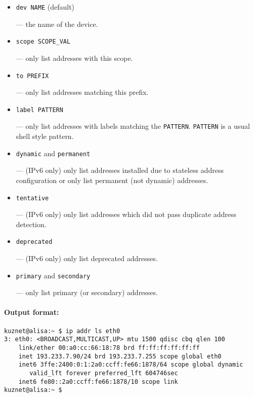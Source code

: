 \begin{itemize}
\item \verb|dev NAME| (default)

--- the name of the device.

\item \verb|scope SCOPE_VAL|

--- only list addresses with this scope.

\item \verb|to PREFIX|

--- only list addresses matching this prefix.

\item \verb|label PATTERN|

--- only list addresses with labels matching the \verb|PATTERN|.
\verb|PATTERN| is a usual shell style pattern.


\item \verb|dynamic| and \verb|permanent|

--- (IPv6 only) only list addresses installed due to stateless
address configuration or only list permanent (not dynamic) addresses.

\item \verb|tentative|

--- (IPv6 only) only list addresses which did not pass duplicate
address detection.

\item \verb|deprecated|

--- (IPv6 only) only list deprecated addresses.


\item  \verb|primary| and \verb|secondary|

--- only list primary (or secondary) addresses.

\end{itemize}


\paragraph{Output format:}

\begin{verbatim}
kuznet@alisa:~ $ ip addr ls eth0
3: eth0: <BROADCAST,MULTICAST,UP> mtu 1500 qdisc cbq qlen 100
    link/ether 00:a0:cc:66:18:78 brd ff:ff:ff:ff:ff:ff
    inet 193.233.7.90/24 brd 193.233.7.255 scope global eth0
    inet6 3ffe:2400:0:1:2a0:ccff:fe66:1878/64 scope global dynamic 
       valid_lft forever preferred_lft 604746sec
    inet6 fe80::2a0:ccff:fe66:1878/10 scope link 
kuznet@alisa:~ $ 
\end{verbatim}

